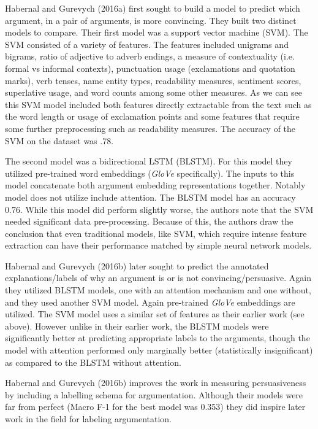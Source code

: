 \documentclass[11pt,a4paper]{article}
\begin{document}
Habernal and Gurevych (2016a) first sought to build a model to predict which argument, in a pair of arguments, is more convincing. They built two distinct models to compare. Their first model was a support vector machine (SVM). The SVM consisted of a variety of features. The features included unigrams and bigrams, ratio of adjective to adverb endings, a measure of contextuality (i.e. formal vs informal contexts), punctuation usage (exclamations and quotation marks), verb tenses, name entity types, readability measures, sentiment scores, superlative usage, and word counts among some other measures. As we can see this SVM model included both features directly extractable from the text such as the word length or usage of exclamation points and some features that require some further preprocessing such as readability measures. The accuracy of the SVM on the dataset was .78.

The second model was a bidirectional LSTM (BLSTM). For this model they utilized pre-trained word embeddings (\textit{GloVe} specifically). The inputs to this model concatenate both argument embedding representations together. Notably model does not utilize include attention. The BLSTM model has an accuracy 0.76. While this model did perform slightly worse, the authors note that the SVM needed  significant data pre-processing. Because of this, the authors draw the conclusion that even traditional models, like SVM, which require intense feature extraction can have their performance matched by simple neural network models.


Habernal and Gurevych (2016b) later sought to predict the annotated explanations/labels of why an argument is or is not convincing/persuasive. Again they utilized BLSTM models, one with an attention mechanism and one without, and they used another SVM model. Again pre-trained  \textit{GloVe} embeddings are utilized. The SVM model uses a similar set of features as their earlier work (see above). However unlike in their earlier work, the BLSTM models were significantly better at predicting appropriate labels to the arguments, though the model with attention performed only marginally better (statistically insignificant) as compared to the BLSTM without attention.

Habernal and Gurevych (2016b) improves the work in measuring persuasiveness by including a labelling schema for argumentation. Although their models were far from perfect (Macro F-1 for the best model was 0.353)  they did inspire later work in the field for labeling argumentation.
\end{document}
